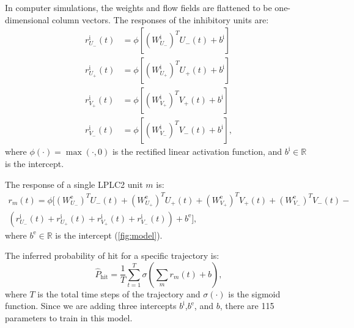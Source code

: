 \documentclass[pdftex,9pt,lineno]{elife}
\let\hat\widehat
\begin{document}

In computer simulations, the weights and flow fields are flattened to be one-dimensional column vectors. The responses of the inhibitory units are:
\begin{align*}
r^{\text{i}}_{U_{-}}(t) &= \phi \left[ (W^{\text{i}}_{U_{-}})^{T}U_{-}(t)+b^{\text{i}} \right] \nonumber \\
r^{\text{i}}_{U_{+}}(t) &= \phi \left[ (W^{\text{i}}_{U_{+}})^{T}U_{+}(t)+b^{\text{i}} \right] \nonumber \\
r^{\text{i}}_{V_{+}}(t) &= \phi \left[ (W^{\text{i}}_{V_{+}})^{T}V_{+}(t)+b^{\text{i}} \right] \nonumber \\
r^{\text{i}}_{V_{-}}(t) &= \phi \left[ (W^{\text{i}}_{V_{-}})^{T}V_{-}(t)+b^{\text{i}} \right],
\end{align*}
where $\phi(\cdot) = \max(\cdot,0)$ is the rectified linear activation function, and $b^{\text{i}} \in \mathbb{R}$ is the intercept.

The response of a single LPLC2 unit $m$ is:
\begin{multline}\label{eq:LPLC2_response}
r_{m}(t) = \phi \Bigg[ (W^{\text{e}}_{U_{-}})^{T}U_{-}(t)+(W^{\text{e}}_{U_{+}})^{T}U_{+}(t)+(W^{\text{e}}_{V_{+}})^{T}V_{+}(t)+(W^{\text{e}}_{V_{-}})^{T}V_{-}(t)- \\
\left(r^{\text{i}}_{U_{-}}(t)+r^{\text{i}}_{U_{+}}(t)+r^{\text{i}}_{V_{+}}(t)+r^{\text{i}}_{V_{-}}(t)\right)+b^{\text{e}} \Bigg],
\end{multline}
where $b^{\text{e}} \in \mathbb{R}$ is the intercept (\ref{fig:model}).

The inferred probability of hit for a specific trajectory is:
\begin{equation}
\hat{P}_{\text{hit}} =\frac{1}{T}\sum_{t=1}^{T} \sigma \left( \sum_{m}r_{m}(t)+b \right),
\label{eq:prob_model}
\end{equation}
where $T$ is the total time steps of the trajectory and $\sigma(\cdot)$ is the sigmoid function. Since we are adding three intercepts $b^{\text{i}}$,$b^{\text{e}}$, and $b$, there are 115 parameters to train in this model.
\end{document}
